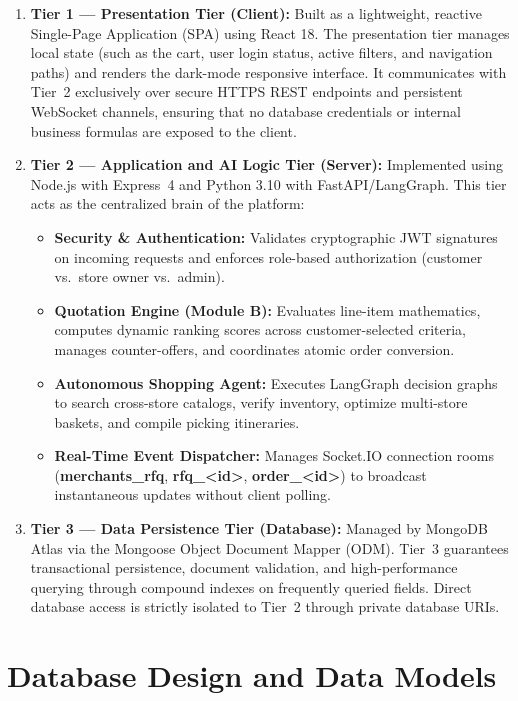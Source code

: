 \begin{enumerate}
    \item \textbf{Tier 1 --- Presentation Tier (Client):} Built as a lightweight, reactive Single-Page Application (SPA) using React 18. The presentation tier manages local state (such as the cart, user login status, active filters, and navigation paths) and renders the dark-mode responsive interface. It communicates with Tier~2 exclusively over secure HTTPS REST endpoints and persistent WebSocket channels, ensuring that no database credentials or internal business formulas are exposed to the client.
    \item \textbf{Tier 2 --- Application and AI Logic Tier (Server):} Implemented using Node.js with Express~4 and Python 3.10 with FastAPI/LangGraph. This tier acts as the centralized brain of the platform:
    \begin{itemize}
        \item \textbf{Security \& Authentication:} Validates cryptographic JWT signatures on incoming requests and enforces role-based authorization (customer vs.\ store owner vs.\ admin).
        \item \textbf{Quotation Engine (Module B):} Evaluates line-item mathematics, computes dynamic ranking scores across customer-selected criteria, manages counter-offers, and coordinates atomic order conversion.
        \item \textbf{Autonomous Shopping Agent:} Executes LangGraph decision graphs to search cross-store catalogs, verify inventory, optimize multi-store baskets, and compile picking itineraries.
        \item \textbf{Real-Time Event Dispatcher:} Manages Socket.IO connection rooms (\textbf{merchants\_rfq}, \textbf{rfq\_<id>}, \textbf{order\_<id>}) to broadcast instantaneous updates without client polling.
    \end{itemize}
    \item \textbf{Tier 3 --- Data Persistence Tier (Database):} Managed by MongoDB Atlas via the Mongoose Object Document Mapper (ODM). Tier~3 guarantees transactional persistence, document validation, and high-performance querying through compound indexes on frequently queried fields. Direct database access is strictly isolated to Tier~2 through private database URIs.
\end{enumerate}

\section{Database Design and Data Models}

